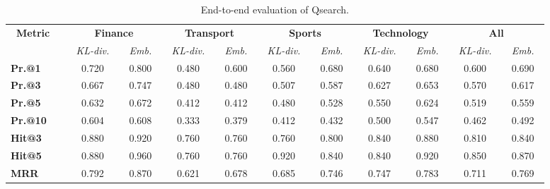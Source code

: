 \begin{table}[t]
\caption{End-to-end evaluation of Qsearch.}
\centering
\begin{tabular}{l |cc|cc|cc|cc| cc } \midrule
 \multirow{2}{*}{\textbf{~Metric~~}} & \multicolumn{2}{c}{\textbf{Finance}} & \multicolumn{2}{|c}{\textbf{Transport}} & \multicolumn{2}{|c}{\textbf{Sports}} & \multicolumn{2}{|c}{\textbf{Technology}} & \multicolumn{2}{|c}{\textbf{ All}} \\
 \cmidrule{2-11}
	&  \textit{~KL-div.~}&   \textit{~Emb.~} &  \textit{~KL-div.~} & \textit{~Emb.~} &   \textit{~KL-div.~}&   \textit{~Emb.~} &  \textit{~KL-div.~} & \textit{~Emb.~} &  \textit{~KL-div.~} & \textit{~Emb.~} \\
\midrule
\textbf{Pr.@1} & 0.720 & 0.800 & 0.480 & 0.600 & 0.560 & 0.680 & 0.640 & 0.680 & 0.600 & 0.690  \\
\textbf{Pr.@3} & 0.667 & 0.747 & 0.480 & 0.480 & 0.507 & 0.587 & 0.627 & 0.653 & 0.570 & 0.617 \\
\textbf{Pr.@5} & 0.632 & 0.672 & 0.412 & 0.412 & 0.480 & 0.528 & 0.550 & 0.624 & 0.519 & 0.559  \\ 
\textbf{Pr.@10} & 0.604 & 0.608 & 0.333 & 0.379 & 0.412 & 0.432 & 0.500 & 0.547 & 0.462 & 0.492 \\ 
\midrule
\textbf{Hit@3} & 0.880 & 0.920 & 0.760 & 0.760 & 0.760 & 0.800 & 0.840 & 0.880 & 0.810 & 0.840 \\
\textbf{Hit@5} & 0.880 & 0.960 & 0.760 & 0.760 & 0.920 & 0.840 & 0.840 & 0.920 & 0.850 & 0.870 \\ 
\midrule
\textbf{MRR} & 0.792 & 0.870 & 0.621 & 0.678 & 0.685  & 0.746 & 0.747 & 0.783 & 0.711 & 0.769 \\
 \midrule
\end{tabular}
\label{table:performance_qsearch}
\end{table}

